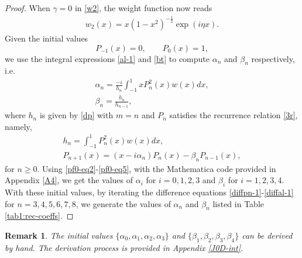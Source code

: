 \documentclass[11pt,a4paper]{article}
\newtheorem{remark}[theorem]{Remark}
\numberwithin{equation}{section}
\begin{document}
\begin{proof}
When $\gamma=0$ in \eqref{w2}, the weight function now reads
\begin{align}
w_2(x)=x(1-x^2)^{-\frac{1}{2}}\exp(\mathit{i}\eta x).
\end{align}
Given the initial values
\[P_{-1}(x)=0,\qquad P_0(x)=1,\]
we use the integral expressions \eqref{al-1} and \eqref{bt} to compute $\alpha_n$ and $\beta_n$ respectively, i.e.
\begin{gather}
\alpha_n=\frac{-i}{h_n}\int_{-1}^1xP_n^2(x)w(x)dx,\label{pf0-eq2}\\
\beta_n=\frac{h_n}{h_{n-1}},
\end{gather}
where $h_n$ is given by \eqref{dp} with $m=n$ and $P_n$ satisfies the recurrence relation \eqref{3r}, namely,
\begin{gather}
h_n=\int_{-1}^1 P_n^2(x)w(x)dx,\label{pf0-eq1}\\
P_{n+1}(x)=(x-i\alpha_{n})P_{n}(x)-\beta_{n}P_{n-1}(x),\label{pf0-eq5}
\end{gather}
for $n\geq0$. Using \eqref{pf0-eq2}-\eqref{pf0-eq5}, with the Mathematica code provided in Appendix \ref{A4}, we get the values of $\alpha_i$ for $i=0,1,2,3$ and $\beta_i$ for $i=1,2,3,4$.
With these initial values, by iterating the difference equations \eqref{diffpn-1}-\eqref{diffal-1} for $n=3,4,5,6,7,8$, we generate the values of $\alpha_n$ and $\beta_n$ listed in Table \ref{tab1:rec-coeffs}.
\end{proof}


\begin{remark}
The initial values $\{\alpha_0,\alpha_1,\alpha_2,\alpha_3\}$ and $\{\beta_1,\beta_2,\beta_3,\beta_4\}$ can be derived by hand. The derivation process is provided in Appendix \ref{J0D-int}.
\end{remark}
\end{document}
